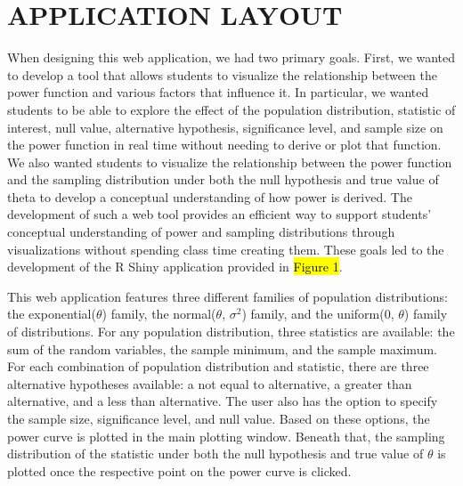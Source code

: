 \documentclass{TISE}
\begin{document}
\section{APPLICATION LAYOUT}

When designing this web application, we had two primary goals. First, we wanted to develop a tool that allows students to visualize the relationship between the power function and various factors that influence it. In particular, we wanted students to be able to explore the effect of the population distribution, statistic of interest, null value, alternative hypothesis, significance level, and sample size on the power function in real time without needing to derive or plot that function. We also wanted students to visualize the relationship between the power function and the sampling distribution under both the null hypothesis and true value of theta to develop a conceptual understanding of how power is derived. The development of such a web tool provides an efficient way to support students' conceptual understanding of power and sampling distributions through visualizations without spending class time creating them. These goals led to the development of the {\sf R} Shiny application provided in \hl{Figure 1}. 

This web application features three different families of population distributions: the exponential($\theta$) family, the normal($\theta$, $\sigma^2$) family, and the uniform(0, $\theta$) family of distributions. For any population distribution, three statistics are available: the sum of the random variables, the sample minimum, and the sample maximum. For each combination of population distribution and statistic, there are three alternative hypotheses available: a not equal to alternative, a greater than alternative, and a less than alternative. The user also has the option to specify the sample size, significance level, and null value. Based on these options, the power curve is plotted in the main plotting window. Beneath that, the sampling distribution of the statistic under both the null hypothesis and true value of $\theta$ is plotted once the respective point on the power curve is clicked. 

\newpage
\end{document}
